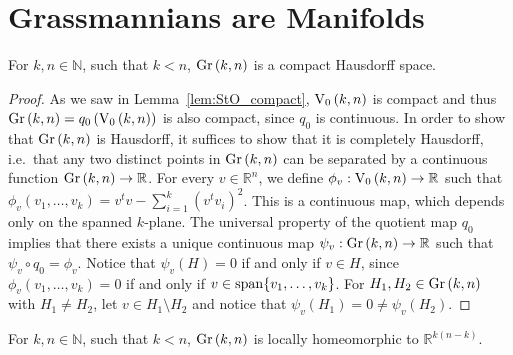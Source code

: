 \section{Grassmannians are Manifolds}
\begin{lemma} For $k,n\in\mathbb{N}$, such that $k<n$, $\Gr{k}{n}$ is a compact Hausdorff space.
\end{lemma}
\begin{proof} As we saw in Lemma~\ref{lem:StO_compact}, $\StO{k}{n}$ is compact and thus $\Gr{k}{n}=q_0\left(\StO{k}{n}\right)$ is also compact, since $q_0$ is continuous. In order to show that $\Gr{k}{n}$ is Hausdorff, it suffices to show that it is completely Hausdorff, i.e.\ that any two distinct points in $\Gr{k}{n}$ can be separated by a continuous function $\Gr{k}{n}\to\mathbb{R}$. For every $v\in\mathbb{R}^n$, we define $\phi_v:\StO{k}{n}\to\mathbb{R}$ such that $\phi_v(v_1,\ldots,v_k)=v^tv-\sum_{i=1}^k{\left(v^tv_i\right)}^2$. This is a continuous map, which depends only on the spanned $k$-plane. The universal property of the quotient map $q_0$ implies that there exists a unique continuous map $\psi_v:\Gr{k}{n}\to\mathbb{R}$ such that $\psi_v\circ q_0=\phi_v$. Notice that $\psi_v(H)=0$ if and only if $v\in H$, since $\phi_v(v_1,\ldots,v_k)=0$ if and only if $v\in \mathrm{span}\{v_1,\ldots,v_k\}$. For $H_1,H_2\in\Gr{k}{n}$ with $H_1\neq H_2$, let $v\in H_1\setminus H_2$ and notice that $\psi_v(H_1)=0\neq\psi_v(H_2)$.
\end{proof}
\begin{proposition}\label{prop:gr_manifold} For $k,n\in\mathbb{N}$, such that $k<n$, $\Gr{k}{n}$ is locally homeomorphic to $\mathbb{R}^{k(n-k)}$.
\end{proposition}
